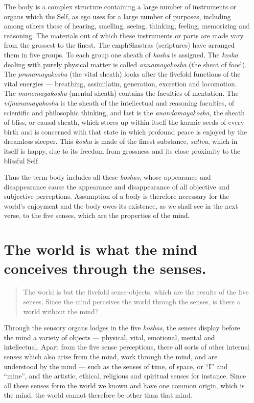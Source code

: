 \documentclass[12pt]{report}
\begin{document}
The body is a complex structure containing a large number of
instruments or organs which the Self, as ego uses for a large number
of purposes, including among others those of hearing, smelling,
seeing, thinking, feeling, memorizing and reasoning. The materials out
of which these instruments or parts are made vary from the grossest to
the finest. The emph{Shastras} (scriptures) have arranged them in five
groups. To each group one sheath of \emph{kosha} is assigned. The
\emph{kosha} dealing with purely physical matter is called
\emph{annamayakosha} (the sheat of food). The \emph{pranamayakosha}
(the vital sheath) looks after the fivefold functions of the vital
energies --- breathing, assimilatin, generation, excretion and
locomotion. The \emph{manomayakosha} (mental sheath) contains the
faculties of mentation. The \emph{vijnanamayakosha} is the sheath of
the intellectual and reasoning faculties, of scientific and
philosophic thinking, and last is the \emph{anandamayakosha}, the
sheath of bliss, or causal sheath, which stores up within itself the
karmic seeds of every birth and is concerned with that state in which
profound peace is enjoyed by the dreamless sleeper. This \emph{kosha}
is made of the finest substance, \emph{sattva}, which in itself is
happy, due to its freedom from grossness and its close proximity to
the blissful Self.

Thus the term body includes all these \emph{koshas}, whose appearance
and disappearance cause the appearance and disappearance of all
objective and subjective perceptions. Assumption of a body is
therefore necessary for the world's enjoyment and the body owes its
existence, as we shall see in the next verse, to the five senses,
which are the properties of the mind.

\section{ The world is what the mind conceives through the senses.}

\begin{quote}
  The world is but the fivefold sense-objects, which are the results of
  the five senses. Since the mind perceives the world through the
  senses, is there a world without the mind?
\end{quote}


Through the sensory organs lodges in the five \emph{koshas}, the
senses display before the mind a variety of objects --- physical,
vital, emotional, mental and intellectual. Apart from the five sense
perceptions, there all sorts of other internal senses which also arise
from the mind, work through the mind, and are understood by the mind
--- such as the senses of time, of space, or ``I'' and ``mine'', and
the artistic, ethical, religious and spiritual senses for
instance. Since all these senses form the world we known and have one 
common origin, which is the mind, the world cannot therefore be other
than that mind.
\end{document}
